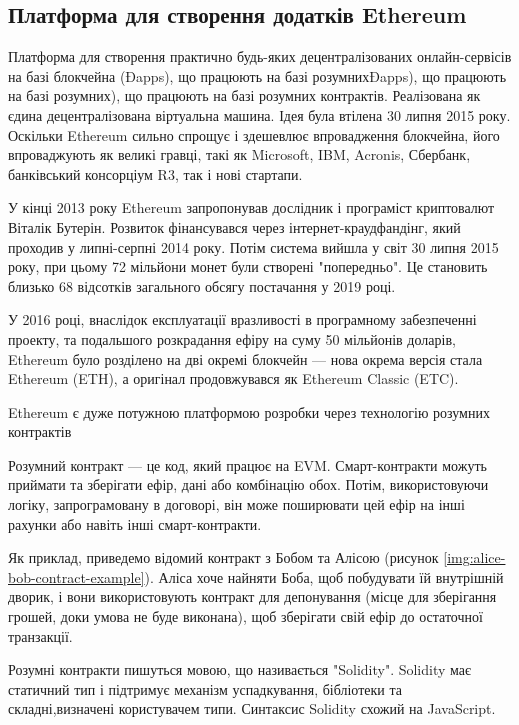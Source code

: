 \documentclass{lib/styles/default-style}
\begin{document}
\subsection{Платформа для створення додатків Ethereum}

    Платформа для створення практично будь-яких децентралізованих
    онлайн-сервісів на базі блокчейна (Đapps), що працюють на базі розумнихĐapps), що працюють на базі розумних), що працюють на базі розумних
    контрактів. Реалізована як єдина децентралізована віртуальна машина. Ідея була
    втілена 30 липня 2015 року. Оскільки Ethereum сильно спрощує і здешевлює
    впровадження блокчейна, його впроваджують як великі гравці, такі як Microsoft, IBM, Acronis,
    Сбербанк, банківський консорціум R3, так і нові стартапи.

    У кінці 2013 року Ethereum запропонував дослідник
    і програміст криптовалют Віталік Бутерін. Розвиток фінансувався через інтернет-краудфандінг, який проходив
    у липні-серпні 2014 року. Потім система вийшла у світ 30 липня 2015 року, при цьому 72 мільйони монет були
    створені "попередньо". Це становить близько 68 відсотків загального обсягу постачання у 2019 році.

    У 2016 році,
    внаслідок експлуатації вразливості в програмному забезпеченні проекту, та подальшого розкрадання ефіру на суму 
    50 мільйонів доларів, Ethereum було розділено на дві окремі блокчейн --- нова окрема версія стала Ethereum (ETH), а оригінал продовжувався 
    як Ethereum Classic (ETC).

    Ethereum є дуже потужною платформою розробки через технологію розумних контрактів

    Розумний контракт --- це код, який працює на EVM.
    Смарт-контракти можуть приймати та зберігати ефір, дані або комбінацію обох.
    Потім, використовуючи логіку, запрограмовану в договорі, він може поширювати
    цей ефір на інші рахунки або навіть інші смарт-контракти.

    Як приклад, приведемо відомий контракт з Бобом та Алісою (рисунок \ref{img:alice-bob-contract-example}). Аліса хоче найняти Боба, щоб побудувати їй внутрішній дворик,
    і вони використовують контракт для депонування (місце для зберігання грошей, доки умова не буде виконана),
    щоб зберігати свій ефір до остаточної транзакції.


    Розумні контракти пишуться мовою, що називається "Solidity". Solidity має статичний тип і підтримує механізм успадкування,
    бібліотеки та складні,визначені користувачем типи. Синтаксис Solidity схожий на JavaScript.
\end{document}
